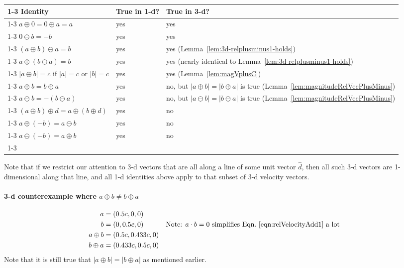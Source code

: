 \documentclass[a4paper]{article}
\theoremstyle{plain}
\theoremstyle{definition}
\newcommand{\hatvec}[1]{\hat{#1}}
\begin{document}
\begin{center}
\begin{tabularx}{1.0\textwidth}{|p{4cm}|p{2cm}|p{7cm}|}
\cline{1-3}
Identity & True in 1-d? & True in 3-d?
\\ \cline{1-3}
$a \oplus 0 = 0 \oplus a = a$ & yes & yes
\\ \cline{1-3}
$0 \ominus b = -b$ & yes & yes
\\ \cline{1-3}
$(a \oplus b) \ominus a = b$ & yes & yes (Lemma~\ref{lem:3d-relplusminus1-holds})
\\ \cline{1-3}
$a \oplus (b \ominus a) = b$ & yes & yes (nearly identical to Lemma~\ref{lem:3d-relplusminus1-holds})
\\ \cline{1-3}
$|a \oplus b| = c$ if $|a|=c$ or $|b|=c$ & yes & yes (Lemma~\ref{lem:magVplusC})
\\ \cline{1-3}
$a \oplus b = b \oplus a$ & yes & no, but $|a \oplus b| = |b \oplus a|$ is true (Lemma~\ref{lem:magnitudeRelVecPlusMinus})
\\ \cline{1-3}
$a \ominus b = - (b \ominus a)$ & yes & no, but $|a \ominus b|=|b \ominus a|$ is true (Lemma~\ref{lem:magnitudeRelVecPlusMinus})
\\ \cline{1-3}
$(a \oplus b) \oplus d = a \oplus (b \oplus d)$ & yes & no
\\ \cline{1-3}
$a \oplus (-b) = a \ominus b$ & yes & no
\\ \cline{1-3}
$a \ominus (-b) = a \oplus b$ & yes & no
\\ \cline{1-3}
\end{tabularx}
\end{center}

Note that if we restrict our attention to 3-d vectors that are all
along a line of some unit vector $\hatvec{d}$, then all such 3-d
vectors are 1-dimensional along that line, and all 1-d identities
above apply to that subset of 3-d velocity vectors.

\paragraph{3-d counterexample where $a \oplus b \neq b \oplus a$}
\begin{align*}
  a & = (0.5c, 0, 0) \\
  b & = (0, 0.5c, 0) & & \text{Note: $a \cdot b = 0$ simplifies Eqn.~\eqref{eqn:relVelocityAdd1} a lot} \\
  a \oplus b & = (0.5c, 0.433c, 0) \\
  b \oplus a & = (0.433c, 0.5c, 0)
\end{align*}
Note that it is still true that $|a \oplus b|=|b \oplus a|$ as
mentioned earlier.
\end{document}
